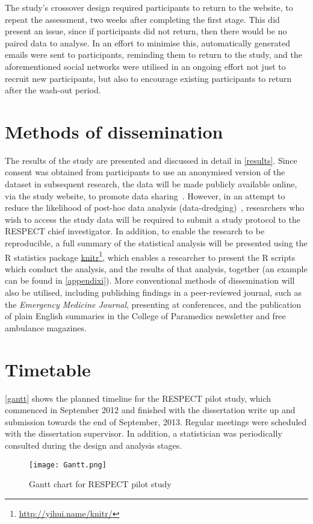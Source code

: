 The study's crossover design required participants to return to the website, to repeat the assessment, two weeks after completing the first stage. This did present an issue, since if participants did not return, then there would be no paired data to analyse. In an effort to minimise this, automatically generated emails were sent to participants, reminding them to return to the study, and the aforementioned social networks were utilised in an ongoing effort not just to recruit new participants, but also to encourage existing participants to return after the wash-out period.

\section{Methods of dissemination}
\label{methodsofdissemination}

The results of the study are presented and discussed in detail in \autoref{results}. Since consent was obtained from participants to use an anonymised version of the dataset in subsequent research, the data will be made publicly available online, via the study website, to promote data sharing~\citep{ross_importance_2012}. However, in an attempt to reduce the likelihood of post-hoc data analysis (data-dredging)~\citep{lord_multiple_2004}, researchers who wish to access the study data will be required to submit a study protocol to the RESPECT chief investigator. In addition, to enable the research to be reproducible, a full summary of the statistical analysis will be presented using the R statistics package \href{http://yihui.name/knitr/}{knitr}\footnote{\href{http://yihui.name/knitr/}{http:/\slash yihui.name\slash knitr\slash }}, which enables a researcher to present the R scripts which conduct the analysis, and the results of that analysis, together (an example can be found in \autoref{appendixi}). More conventional methods of dissemination will also be utilised, including publishing findings in a peer-reviewed journal, such as the \emph{Emergency Medicine Journal}, presenting at conferences, and the publication of plain English summaries in the College of Paramedics newsletter and free ambulance magazines. 

\section{Timetable}
\label{timetable}

\autoref{gantt} shows the planned timeline for the RESPECT pilot study, which commenced in September 2012 and finished with the dissertation write up and submission towards the end of September, 2013. Regular meetings were scheduled with the dissertation supervisor. In addition, a statistician was periodically consulted during the design and analysis stages.

 \begin{figure}[htbp] 

 \centering 

 \texttt{[image: Gantt.png]}  

 \caption{Gantt chart for RESPECT pilot study}  

 \label{gantt}  

 \end{figure}  
